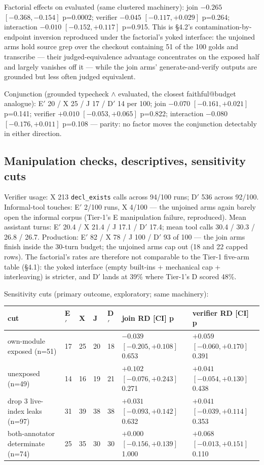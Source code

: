 \documentclass[10pt]{article}
\newcommand{\code}[1]{\texttt{#1}}
\begin{document}
Factorial effects on evaluated (same clustered machinery): join
$\mathbf{-0.265}$ $[-0.368, -0.154]$ p=0.0002; verifier $-0.045$
$[-0.117, +0.029]$ p=0.264; interaction $-0.010$ $[-0.152, +0.117]$
p=0.915. This is \S 4.2's contamination-by-endpoint inversion
reproduced under the factorial's yoked interface: the unjoined arms
hold source grep over the checkout containing 51 of the 100 golds and
transcribe --- their judged-equivalence advantage concentrates on the
exposed half and largely vanishes off it --- while the join arms'
generate-and-verify outputs are grounded but less often judged
equivalent.

Conjunction (grounded typecheck $\wedge$ evaluated, the closest
faithful@budget analogue): E$'$ 20 / X 25 / J 17 / D$'$ 14 per 100;
join $-0.070$ $[-0.161, +0.021]$ p=0.141; verifier $+0.010$
$[-0.053, +0.065]$ p=0.822; interaction $-0.080$ $[-0.176, +0.011]$
p=0.108 --- parity: no factor moves the conjunction detectably in
either direction.

\subsection{Manipulation checks, descriptives, sensitivity cuts}

Verifier usage: X 213 \code{decl\_exists} calls across 94/100 runs;
D$'$ 536 across 92/100. Informal-tool touches: E$'$ 2/100 runs, X
4/100 --- the unjoined arms again barely open the informal corpus
(Tier-1's E manipulation failure, reproduced). Mean assistant turns:
E$'$ 20.4 / X 21.4 / J 17.1 / D$'$ 17.4; mean tool calls 30.4 / 30.3 /
26.8 / 26.7. Production: E$'$ 82 / X 78 / J 100 / D$'$ 93 of 100 ---
the join arms finish inside the 30-turn budget; the unjoined arms cap
out (18 and 22 capped rows). The factorial's rates are therefore not
comparable to the Tier-1 five-arm table (\S 4.1): the yoked interface
(empty built-ins + mechanical cap + interleaving) is stricter, and
D$'$ lands at 39\% where Tier-1's D scored 48\%.

Sensitivity cuts (primary outcome, exploratory; same machinery):

\begin{center}\footnotesize
\begin{tabular}{@{}lllllll@{}}
\toprule
cut & E$'$ & X & J & D$'$ & join RD [CI] p & verifier RD [CI] p \\
\midrule
own-module exposed (n=51) & 17 & 25 & 20 & 18 & $-0.039$ $[-0.205, +0.108]$ 0.653 & $+0.059$ $[-0.060, +0.170]$ 0.391 \\
unexposed (n=49) & 14 & 16 & 19 & 21 & $+0.102$ $[-0.076, +0.243]$ 0.271 & $+0.041$ $[-0.054, +0.130]$ 0.438 \\
drop 3 live-index leaks (n=97) & 31 & 39 & 38 & 38 & $+0.031$ $[-0.093, +0.142]$ 0.632 & $+0.041$ $[-0.039, +0.114]$ 0.353 \\
both-annotator determinate (n=74) & 25 & 35 & 30 & 30 & $+0.000$ $[-0.156, +0.139]$ 1.000 & $+0.068$ $[-0.013, +0.151]$ 0.110 \\
\bottomrule
\end{tabular}
\end{center}
\end{document}
